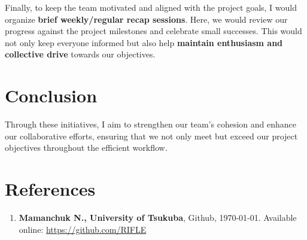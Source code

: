 \documentclass[12pt,a4paper]{article}
\begin{document}
Finally, to keep the team motivated and aligned with the project goals, I would organize \textbf{brief weekly/regular recap sessions}. Here, we would review our progress against the project milestones and celebrate small successes. This would not only keep everyone informed but also help \textbf{maintain enthusiasm and collective drive} towards our objectives.

\section{Conclusion}
Through these initiatives, I aim to strengthen our team's cohesion and enhance our collaborative efforts, ensuring that we not only meet but exceed our project objectives throughout the efficient workflow.

\section*{References}
\begin{enumerate}
    \item \textbf{Mamanchuk N., University of Tsukuba}, Github, \today. Available online: \url{https://github.com/RIFLE}
\end{enumerate}
\end{document}
